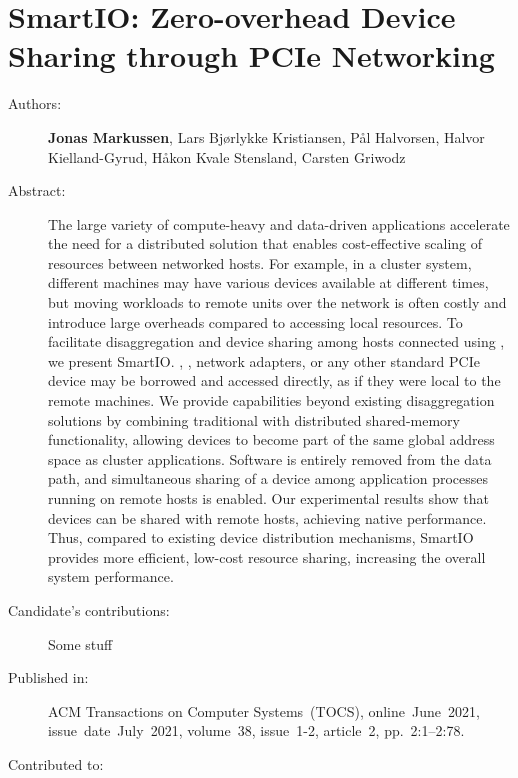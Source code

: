 \chapter{SmartIO: Zero-overhead Device Sharing through PCIe Networking}
\label{paper:TOCS-2021}
\paperthumb

\begin{description}
	\item[Authors:]
		\textbf{Jonas Markussen}, Lars Bj{\o}rlykke Kristiansen, P{\aa}l Halvorsen,
		Halvor Kielland-Gyrud, H{\aa}kon Kvale Stensland, Carsten Griwodz

	\item[Abstract:]
		The large variety of compute-heavy and data-driven applications accelerate the need for a distributed
		 solution that enables cost-effective scaling of resources between networked hosts. For example,
		in a cluster system, different machines may have various devices available at different times, 
		but moving workloads to remote units over the network is often costly and introduce 
		large overheads compared to accessing local resources. 
		To facilitate  \gls{disaggregation} and device sharing among hosts connected using  
		, we present SmartIO. , , network adapters, 
		or any other standard PCIe device may be borrowed and accessed directly, as if they were local to the remote machines.
		We provide capabilities beyond existing \gls{disaggregation} solutions 
		by combining traditional  with distributed shared-memory functionality, allowing devices 
		to become part of the same global address space as cluster applications.
		Software is entirely removed from the data path, and simultaneous sharing of a device among 
		application processes running on remote hosts is enabled.
		Our experimental results show that  devices can be shared with remote hosts,
		achieving native  performance.
		Thus, compared to existing device distribution mechanisms, SmartIO provides more efficient, low-cost resource
		sharing, increasing the overall system performance.

	\item[Candidate's contributions:]
		Some stuff

	\item[Published in:]
		ACM Transactions on Computer Systems~(TOCS), 
		online~June~2021,
		issue~date~July~2021, 
		volume~38, issue~1-2, article~2, pp.~2:1--2:78.

	\item[Contributed to:]

\end{description}
